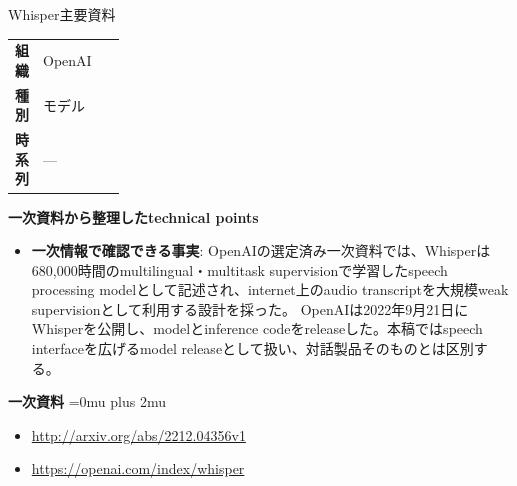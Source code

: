 \begin{technicalnote}{Whisper}{主要資料}
\begingroup
\begin{tabularx}{\linewidth}{@{}>{\bfseries}p{0.22\linewidth}X@{}}
組織 & OpenAI \\
種別 & モデル \\
時系列 & — \\
\end{tabularx}
\smallskip
{\bfseries 一次資料から整理したtechnical points}
\begin{itemize}[leftmargin=1.5em,itemsep=0.35em]
\item \textbf{一次情報で確認できる事実}: OpenAIの選定済み一次資料では、Whisperは680,000時間のmultilingual・multitask supervisionで学習したspeech processing modelとして記述され、internet上のaudio transcriptを大規模weak supervisionとして利用する設計を採った。 OpenAIは2022年9月21日にWhisperを公開し、modelとinference codeをreleaseした。本稿ではspeech interfaceを広げるmodel releaseとして扱い、対話製品そのものとは区別する。
\end{itemize}
\begin{minipage}{\linewidth}
\begin{samepage}
{\bfseries 一次資料}
\begingroup\sloppy
\Urlmuskip=0mu plus 2mu\relax
\begin{itemize}[leftmargin=1.5em,itemsep=0.25em]
\item {\scriptsize\url{http://arxiv.org/abs/2212.04356v1}}
\item {\scriptsize\url{https://openai.com/index/whisper}}
\end{itemize}
\endgroup
\end{samepage}
\end{minipage}
\endgroup
\end{technicalnote}
\medskip

